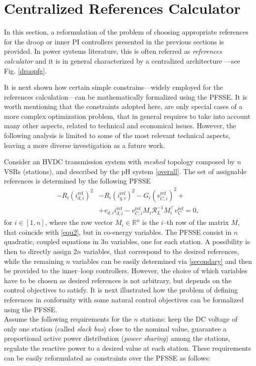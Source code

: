 \documentclass[5p,twocolumn]{elsarticle}
\numberwithin{equation}{section}
\begin{document}
\section{Centralized References Calculator}
\label{sec7}
In this section, a reformulation of the problem of choosing appropriate references for the droop or inner PI controllers presented in the previous sections is provided. In power systems literature, this is
often referred as \textit{references calculator}  \cite{berteen}  and it is in general characterized by a centralized architecture ---see Fig. \ref{droopfg}. 

It is next shown how certain simple constrains---widely employed for the references calculation---can be mathematically formalized using the PFSSE. It is worth mentioning that the constraints adopted here, are only special cases of a more complex optimization problem, that in general requires to take into account many other aspects, related to technical and economical issues. However, the following analysis is limited to some of the most relevant technical aspects, leaving a more diverse investigation as a future work.


Consider an HVDC transmission system with \textit{meshed} topology composed by $n$ VSRs (stations), and described by the pH system \eqref{overall}.  The set of assignable references is determined by the following PFSSE
\begin{equation}\label{secondary}
\begin{split}
- R_i(i_{d,i}^{\mathrm{ref}})^2&-R_i(i_{q,i}^{\mathrm{ref}})^2 -G_i(v_{C,i}^{\mathrm{ref}})^2+\\
&+v_{d,i}i^{\mathrm{ref}}_{d,i}-v^{\mathrm{ref}}_{C,i}M_{i}\mathcal{R}_L^{-1}M_{i}^\top v^{\mathrm{ref}}_C=0,
\end{split}
\end{equation}
for $i\in[1,n]$, where the row vector $M_{ i}\in\mathbb{R}^n$ is the $i$--th row of the matrix $M $, that coincide with \eqref{equ2}, but in co-energy variables. The PFSSE consist in $n$ quadratic, coupled equations in $3n$ variables, one for each station. A possibility is then to directly assign $2n$ variables, that correspond to the desired references, while the remaining $n$ variables can be easily determined via \eqref{secondary} and then be provided to the inner--loop controllers. However, the choice of which variables have to be chosen as desired references is not arbitrary, but depends on the control objectives to satisfy. It is next illustrated how the problem of defining references in conformity with some natural control objectives can be formalized using the PFSSE. \\
Assume the following requirements for the $n$ stations:  keep the DC voltage of only one station (called \textit{slack bus}) close to the nominal value, guarantee a proportional active power distribution (\textit{power sharing}) among the stations, regulate the reactive power to a desired value at each station. These requirements can be easily reformulated as constraints over the PFSSE as follows:
\end{document}
